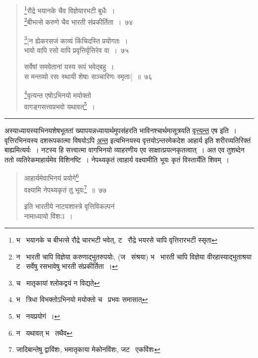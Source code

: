 \documentclass[11pt, openany]{book}
\begin{document}
\begin{quote}
{\na \renewcommand{\thefootnote}{1}\footnote{भ \textendash\ भयानके च बीभत्से रौद्रे चारभटी भवेत्, ट \textendash\ रौद्रे भयरसे चापि वृत्तिरारभटी स्सृता}रौद्रे भयानके चैव विज्ञेयारभटी बुधैः~।\\
\renewcommand{\thefootnote}{2}\footnote{न \textendash\ भारती चापि विज्ञेया करुणाद्भुतरुपयोः, (ज \textendash\ संश्रया) भ \textendash\ भारती चापि विज्ञेया वीरहास्याद्भुताश्रया ट \textendash\ सर्वेषु रसभावेषु भारती संप्रकीर्तिता~।}बीभत्से करुणे चैव भारती संप्रकीर्तिता~।~७४

\renewcommand{\thefootnote}{3}\footnote{च \textendash\ मातृकायां श्लोकद्वयं न विद्यते}[न ह्येकरसजं काव्यं किंचिदस्ति प्रयोगतः~।\\
भावो वापि रसो वापि प्रवृत्तिर्वृत्तिरेव वा~।~७५

सर्वेषां समवेतानां यस्य रूपं भवेद्बहु~।\\
स मन्तव्यो रसः स्थायी शेषाः सञ्चारिणः स्मृताः]~॥~७६

\renewcommand{\thefootnote}{4}\footnote{भ \textendash\ त्रिधा विभक्तोऽभिनयो मयोक्तो च \textendash\ प्रभवः समासात्}वृत्यन्त एषोऽभिनयो मयोक्तो\\
वागङ्गसत्त्वप्रभवो यथावत्\renewcommand{\thefootnote}{5}\footnote{भ \textendash\ नयप्रयोगं~।}~।\\}
\end{quote}

\hrule

\vspace{2mm}
अस्याध्यायस्याभिनयशेषभूततां ख्यापयन्नध्यायार्थमुपसंहरति भाविनश्चार्थमासूत्रयति \underline{वृत्त्यन्त} एष इति~। वृत्तिरभिनयस्य दशरूपकात्मा विषयोऽपि \underline{अन्त} इत्यभिनयस्य वृत्तयोऽन्तरमेकदेश आहार्य इति शरीरव्यतिरिक्तं बाह्यमित्यर्यः~। नटस्य हि सत्त्वात्मा वागभिनयो व्याहरणीय एव साक्षात्प्रयत्नकृतत्वात्~। अत एव तुशब्देन ततो व्यतिरेकमाहार्यमेव विशिनष्टि~। नेपथ्यकृतं त्वाहार्य वक्ष्यामीति भूयः कृतं विस्तार्येति शिवम्~।

\newpage

\begin{quote}
{\na आहार्यमेवाभिनयं प्रयोगे\renewcommand{\thefootnote}{1}\footnote{न \textendash\ यथावत् भ \textendash\ तथैव}\\
वक्ष्यामि नेपथ्यकृतं तु भूयः\renewcommand{\thefootnote}{2}\footnote{जादिबान्तेषु द्वाविंशः, भमातृकाया मेकोनविंशः, जट \textendash\ एकविंशः}~॥~७७

इति भारतीये नाट्यशास्त्रे वृत्तिविकल्पनं\\
नामाध्यायो विंशः3~।}
\end{quote}
\end{document}
